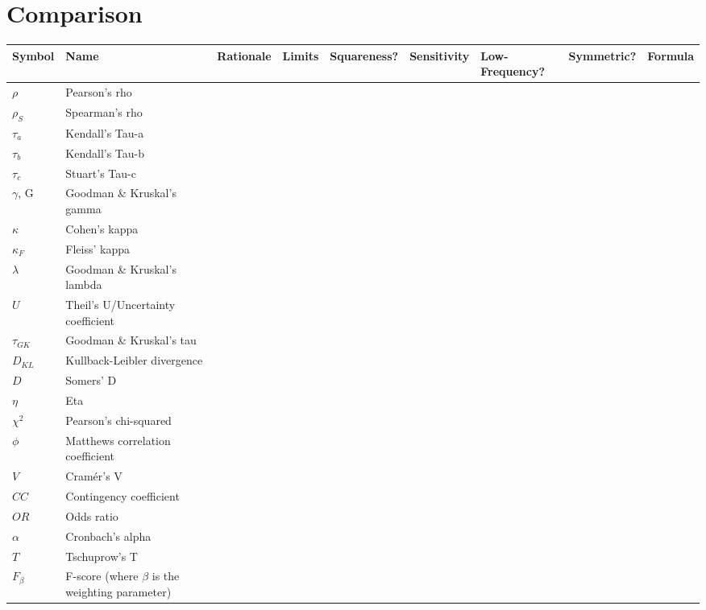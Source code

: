 \documentclass[11pt]{article}
\begin{document}
\section{Comparison}
\begin{landscape}
\centering
\begin{longtable}{|l|l|l|l|l|l|l|l|l|}
\hline
\textbf{Symbol} & \textbf{Name} & \textbf{Rationale} & \textbf{Limits} & \textbf{Squareness?} & \textbf{Sensitivity} & \textbf{Low-Frequency?} & \textbf{Symmetric?} & \textbf{Formula} \\
\hline

$\rho$              & Pearson's rho \\ \hline
$\rho_S$            & Spearman's rho \\ \hline
$\tau_a$            & Kendall's Tau-a \\ \hline
$\tau_b$            & Kendall's Tau-b \\ \hline
$\tau_c$            & Stuart's Tau-c \\ \hline
$\gamma$, G         & Goodman \& Kruskal's gamma\\ \hline
$\kappa$            & Cohen's kappa \\ \hline
$\kappa_F$          & Fleiss' kappa \\ \hline
$\lambda$           & Goodman \& Kruskal's lambda\\ \hline
$U$                 & Theil's U/Uncertainty coefficient\\ \hline
$\tau_{GK}$         & Goodman \& Kruskal's tau\\ \hline
$D_{KL}$            & Kullback-Leibler divergence\\ \hline
$D$                 & Somers' D\\ \hline
$\eta$              & Eta \\ \hline
$\chi^2$            & Pearson's chi-squared\\ \hline
$\phi$              & Matthews correlation coefficient\\ \hline
$V$                 & Cram\'er's V\\ \hline
$CC$                & Contingency coefficient \\ \hline
$OR$                & Odds ratio\\ \hline
$\alpha$            & Cronbach's alpha\\ \hline
$T$                 & Tschuprow's T\\ \hline
$F_\beta$           & F-score (where $\beta$ is the weighting parameter)\\ \hline

\end{longtable}
\end{landscape}
\end{document}
